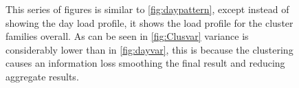 \begin{figure}[ht]
\centering
{}

\caption[Cluster Family Load Profiles]{This series of figures is similar to \ref{fig:daypattern}, except instead of showing the day load profile, it shows the load profile for the cluster families overall. As can be seen in \ref{fig:Clusvar} variance is considerably lower than in \ref{fig:dayvar}, this is because the clustering causes an information loss smoothing the final result and reducing aggregate results.}
\label{fig:Familypattern}
\end{figure}


